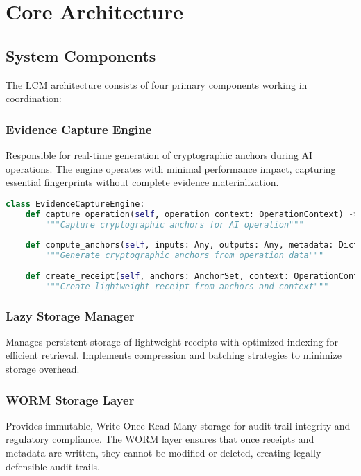 \documentclass[12pt,a4paper]{article}
\begin{document}
\section{Core Architecture}

\subsection{System Components}

The LCM architecture consists of four primary components working in coordination:

\subsubsection{Evidence Capture Engine}

Responsible for real-time generation of cryptographic anchors during AI operations. The engine operates with minimal performance impact, capturing essential fingerprints without complete evidence materialization.

\begin{lstlisting}[language=Python, caption=Evidence Capture Engine Interface]
class EvidenceCaptureEngine:
    def capture_operation(self, operation_context: OperationContext) -> LightweightReceipt:
        """Capture cryptographic anchors for AI operation"""
        
    def compute_anchors(self, inputs: Any, outputs: Any, metadata: Dict) -> AnchorSet:
        """Generate cryptographic anchors from operation data"""
        
    def create_receipt(self, anchors: AnchorSet, context: OperationContext) -> LightweightReceipt:
        """Create lightweight receipt from anchors and context"""
\end{lstlisting}

\subsubsection{Lazy Storage Manager}

Manages persistent storage of lightweight receipts with optimized indexing for efficient retrieval. Implements compression and batching strategies to minimize storage overhead.

\subsubsection{WORM Storage Layer}

Provides immutable, Write-Once-Read-Many storage for audit trail integrity and regulatory compliance. The WORM layer ensures that once receipts and metadata are written, they cannot be modified or deleted, creating legally-defensible audit trails.
\end{document}
